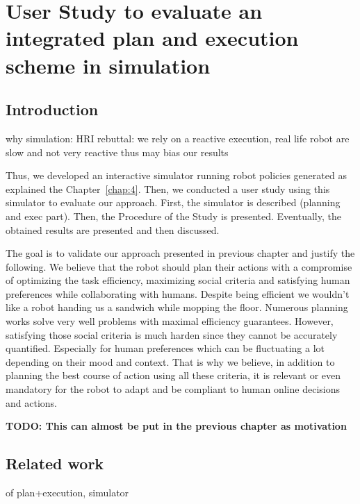 \ifdefined{}
\else
\setcounter{chapter}{4} 
\dominitoc
\faketableofcontents
\fi

\chapter{User Study to evaluate an integrated plan and execution scheme in simulation}
\label{chap:5}
\minitoc

\section{Introduction}

why simulation: HRI rebuttal: we rely on a reactive execution, real life robot are slow and not very reactive thus may bias our results

Thus, we developed an interactive simulator running robot policies generated as explained the Chapter~\ref{chap:4}. Then, we conducted a user study using this simulator to evaluate our approach.
First, the simulator is described (planning and exec part). Then, the Procedure of the Study is presented. Eventually, the obtained results are presented and then discussed.

The goal is to validate our approach presented in previous chapter and justify the following. We believe that the robot should plan their actions with a compromise of optimizing the task efficiency, maximizing social criteria and satisfying human preferences while collaborating with humans. Despite being efficient we wouldn't like a robot handing us a sandwich while mopping the floor. Numerous planning works solve very well problems with maximal efficiency guarantees. However, satisfying those social criteria is much harden since they cannot be accurately quantified. Especially for human preferences which can be fluctuating a lot depending on their mood and context. That is why we believe, in addition to planning the best course of action using all these criteria, it is relevant or even mandatory for the robot to adapt and be compliant to human online decisions and actions. 

\textbf{TODO: This can almost be put in the previous chapter as motivation}

\section{Related work}
of plan+execution, simulator

